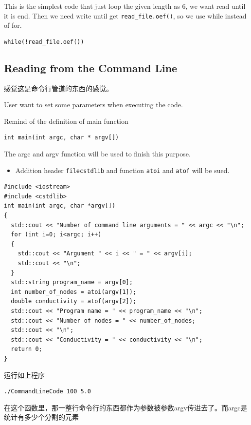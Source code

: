 \documentclass[
]{book}
\providecommand{\tightlist}{%
  \setlength{\itemsep}{0pt}\setlength{\parskip}{0pt}}
\theoremstyle{definition}
\theoremstyle{definition}
\theoremstyle{definition}
\theoremstyle{remark}
\begin{document}
This is the simplest code that just loop the given length as 6, we want read until it is end. Then we need write until get \texttt{read\_file.oef()}, so we use while instead of for.

\begin{verbatim}
while(!read_file.oef())
\end{verbatim}

\hypertarget{reading-from-the-command-line}{%
\subsection{Reading from the Command Line}\label{reading-from-the-command-line}}

感觉这是命令行管道的东西的感觉。

User want to set some parameters when executing the code.

Remind of the definition of main function

\begin{verbatim}
int main(int argc, char * argv[])
\end{verbatim}

The argc and argv function will be used to finish this purpose.

\begin{itemize}
\tightlist
\item
  Addition header \texttt{filecstdlib} and function \texttt{atoi} and \texttt{atof} will be sued.
\end{itemize}

\begin{verbatim}
#include <iostream> 
#include <cstdlib>
int main(int argc, char *argv[]) 
{
  std::cout << "Number of command line arguments = " << argc << "\n"; 
  for (int i=0; i<argc; i++) 
  {
    std::cout << "Argument " << i << " = " << argv[i];
    std::cout << "\n"; 
  }
  std::string program_name = argv[0];
  int number_of_nodes = atoi(argv[1]); 
  double conductivity = atof(argv[2]); 
  std::cout << "Program name = " << program_name << "\n"; 
  std::cout << "Number of nodes = " << number_of_nodes; 
  std::cout << "\n"; 
  std::cout << "Conductivity = " << conductivity << "\n";
  return 0;
}
\end{verbatim}

运行如上程序

\begin{verbatim}
./CommandLineCode 100 5.0
\end{verbatim}

在这个函数里，那一整行命令行的东西都作为参数被参数argv传进去了。而argc是统计有多少个分割的元素
\end{document}
